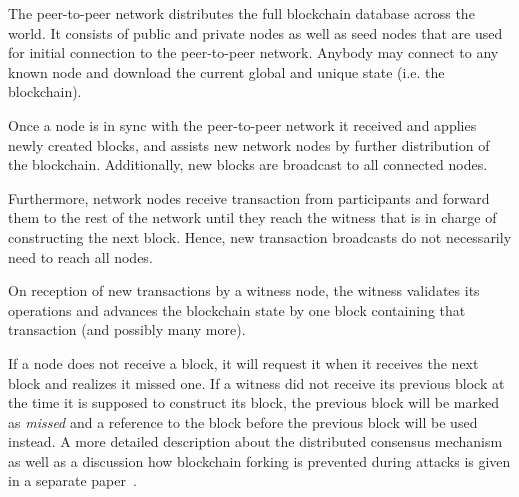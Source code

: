 The peer-to-peer network distributes the full blockchain database across the
world. It consists of public and private nodes as well as seed nodes that are
used for initial connection to the peer-to-peer network. Anybody may connect to
any known node and download the current global and unique state (i.e. the
blockchain).

Once a node is in sync with the peer-to-peer network it received and applies
newly created blocks, and assists new network nodes by further distribution of
the blockchain. Additionally, new blocks are broadcast to all connected nodes.

Furthermore, network nodes receive transaction from participants and forward
them to the rest of the network until they reach the witness that is in charge
of constructing the next block. Hence, new transaction broadcasts do not
necessarily need to reach all nodes.

On reception of new transactions by a witness node, the witness validates its
operations and advances the blockchain state by one block containing that
transaction (and possibly many more).

If a node does not receive a block, it will request it when it receives the
next block and realizes it missed one. If a witness did not receive its
previous block at the time it is supposed to construct its block, the previous
block will be marked as \emph{missed} and a reference to the block before the
previous block will be used instead. A more detailed description about the
distributed consensus mechanism as well as a discussion how blockchain forking
is prevented during attacks is given in a separate paper~\cite{}. %



